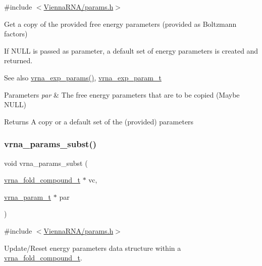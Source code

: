 {\ttfamily \#include $<$\hyperlink{params_8h}{Vienna\+R\+N\+A/params.\+h}$>$}



Get a copy of the provided free energy parameters (provided as Boltzmann factors) 

If N\+U\+LL is passed as parameter, a default set of energy parameters is created and returned.

\begin{DoxySeeAlso}{See also}
\hyperlink{group__energy__parameters_gab1f3016f96aa96bff020cdd904605afa}{vrna\+\_\+exp\+\_\+params()}, \hyperlink{group__energy__parameters_ga01d8b92fe734df8d79a6169482c7d8d8}{vrna\+\_\+exp\+\_\+param\+\_\+t}
\end{DoxySeeAlso}

\begin{DoxyParams}{Parameters}
{\em par} & The free energy parameters that are to be copied (Maybe N\+U\+LL) \\
\hline
\end{DoxyParams}
\begin{DoxyReturn}{Returns}
A copy or a default set of the (provided) parameters 
\end{DoxyReturn}
\mbox{\label{group__energy__parameters_ga5d1909208f7ea3baa98b75afaa1f62ca}} 
\subsubsection{\texorpdfstring{vrna\+\_\+params\+\_\+subst()}{vrna\_params\_subst()}}
{\footnotesize\ttfamily void vrna\+\_\+params\+\_\+subst (\begin{DoxyParamCaption}\item[{\hyperlink{group__fold__compound_ga1b0cef17fd40466cef5968eaeeff6166}{vrna\+\_\+fold\+\_\+compound\+\_\+t} $\ast$}]{vc,  }\item[{\hyperlink{group__energy__parameters_ga8a69ca7d787e4fd6079914f5343a1f35}{vrna\+\_\+param\+\_\+t} $\ast$}]{par }\end{DoxyParamCaption})}



{\ttfamily \#include $<$\hyperlink{params_8h}{Vienna\+R\+N\+A/params.\+h}$>$}



Update/\+Reset energy parameters data structure within a \hyperlink{group__fold__compound_ga1b0cef17fd40466cef5968eaeeff6166}{vrna\+\_\+fold\+\_\+compound\+\_\+t}. 

